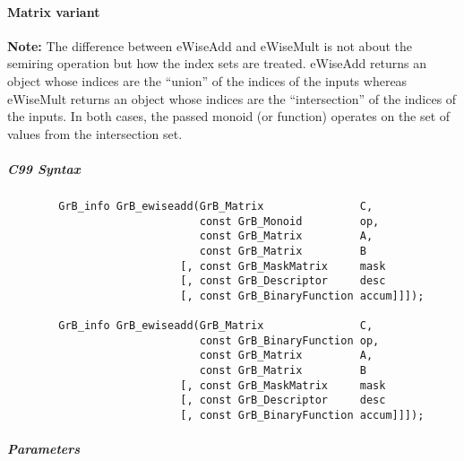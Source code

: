 
\paragraph{Matrix variant}

{\bf Note:} The difference between {\sf eWiseAdd} and {\sf eWiseMult} is not about the semiring operation but how the index sets are treated.
{\sf eWiseAdd} returns an object whose indices are the ``union'' of the indices of the inputs whereas  
{\sf eWiseMult} returns an object whose indices are the ``intersection'' of the indices of the inputs. In both cases, the passed monoid (or function) operates on the 
set of values from the intersection set. 



\subparagraph{C99 Syntax}

\begin{verbatim}
        GrB_info GrB_ewiseadd(GrB_Matrix               C,
                              const GrB_Monoid         op, 
                              const GrB_Matrix         A,
                              const GrB_Matrix         B
                           [, const GrB_MaskMatrix     mask
                           [, const GrB_Descriptor     desc
                           [, const GrB_BinaryFunction accum]]]);
                            
        GrB_info GrB_ewiseadd(GrB_Matrix               C,
                              const GrB_BinaryFunction op, 
                              const GrB_Matrix         A,
                              const GrB_Matrix         B
                           [, const GrB_MaskMatrix     mask
                           [, const GrB_Descriptor     desc
                           [, const GrB_BinaryFunction accum]]]);
\end{verbatim}

\subparagraph{Parameters}

